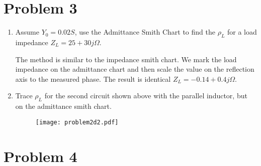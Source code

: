 \section*{Problem 3}

\begin{enumerate}[label=(\alph*)]
    \item Assume $Y_0 = 0.02S$, use the Admittance Smith Chart to find the $\rho_L$ for a load impedance $Z_L = 25 + 30j \Omega$.

    The method is similar to the impedance smith chart. We mark the load impedance on the admittance chart and then scale the value on the reflection axis to the measured phase. The result is identical $Z_L = -0.14 + 0.4j \Omega$.

    \item Trace $\rho_L$ for the second circuit shown above with the parallel inductor, but on the admittance smith chart.
    \begin{figure}[H]
        \centering \texttt{[image: problem2d2.pdf]}
    \end{figure}
\end{enumerate}

\section*{Problem 4}

